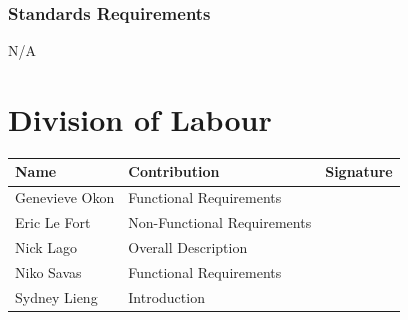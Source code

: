 \documentclass[titlepage]{article}
\begin{document}
\subsubsection{Standards Requirements}
N/A


\appendix
\newpage
\section{Division of Labour}
\begin{center}
\begin{tabular}{ | p{6cm} | p{6cm}| p{4cm} | } \hline
Name& Contribution & Signature\\ 
\hline
Genevieve Okon 	& Functional Requirements 		&	\\  \hline
Eric Le Fort		& Non-Functional Requirements	& 	\\  \hline
Nick Lago			& Overall Description  			&	\\  \hline
Niko Savas		& Functional Requirements		&	\\  \hline
Sydney Lieng		& Introduction					&	\\  \hline
\end{tabular}
\end{center}
\end{document}
